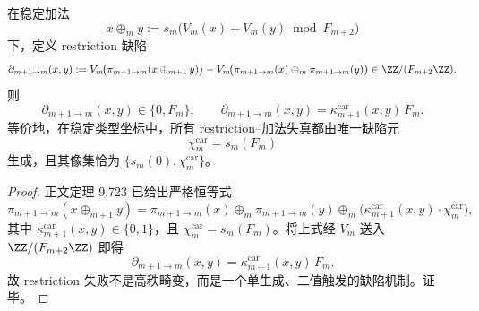 \begin{proposition}\label{prop:conclusion-foldbin-restriction-addition-rankone-defect}
在稳定加法
\[
x\oplus_m y:=s_m\!\bigl(V_m(x)+V_m(y)\bmod F_{m+2}\bigr)
\]
下，定义 restriction 缺陷
\[
\partial_{m+1\to m}(x,y)
:=
V_m\!\bigl(\pi_{m+1\to m}(x\oplus_{m+1}y)\bigr)
-
V_m\!\bigl(\pi_{m+1\to m}(x)\oplus_m\pi_{m+1\to m}(y)\bigr)
\in \ZZ/(F_{m+2}\ZZ).
\]
则
\[
\partial_{m+1\to m}(x,y)\in \{0,F_m\},
\qquad
\partial_{m+1\to m}(x,y)=\kappa_{m+1}^{\mathrm{car}}(x,y)\,F_m.
\]
等价地，在稳定类型坐标中，所有 restriction--加法失真都由唯一缺陷元
\[
\chi_m^{\mathrm{car}}=s_m(F_m)
\]
生成，且其像集恰为 \(\{s_m(0),\chi_m^{\mathrm{car}}\}\)。
\end{proposition}
\begin{proof}
正文定理 9.723 已给出严格恒等式
\[
\pi_{m+1\to m}(x\oplus_{m+1}y)
=
\pi_{m+1\to m}(x)\oplus_m\pi_{m+1\to m}(y)\oplus_m
\bigl(\kappa_{m+1}^{\mathrm{car}}(x,y)\cdot \chi_m^{\mathrm{car}}\bigr),
\]
其中 \(\kappa_{m+1}^{\mathrm{car}}(x,y)\in\{0,1\}\)，且 \(\chi_m^{\mathrm{car}}=s_m(F_m)\)。将上式经 \(V_m\) 送入 \(\ZZ/(F_{m+2}\ZZ)\) 即得
\[
\partial_{m+1\to m}(x,y)=\kappa_{m+1}^{\mathrm{car}}(x,y)\,F_m.
\]
故 restriction 失败不是高秩畸变，而是一个单生成、二值触发的缺陷机制。证毕。
\end{proof}
